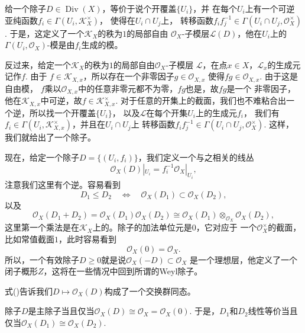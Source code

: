 \begin{para}[Cartier除子与线丛]
    给一个除子$D\in \operatorname{Div}(X)$，等价于说个开覆盖$\{U_i\}$，并
    在每个$U_i$上有一个可逆亚纯函数$f_i\in \Gamma(U_i,\mathcal K_X^\times)$，
    使得在$U_i\cap U_j$上，
    转移函数$f_if_j^{-1}\in \Gamma(U_i\cap U_j,\mathcal O_X^\times)$.
    于是，这定义了一个$\mathcal K_X$的秩为$1$的局部自由
    $\mathcal O_X$-子模层$\mathcal L(D)$，他在$U_i$上的
    $\Gamma(U_i,\mathcal O_X)$-模是由$f_i$生成的模。

    反过来，给定一个$\mathcal K_X$的秩为$1$的局部自由$\mathcal O_X$-子模层
    $\mathcal L$，在点$x\in X$，$\mathcal L_x$的生成元记作$f$. 由于
    $f\in \mathcal K_{X,x}$，所以存在一个非零因子$g\in \mathcal O_{X,x}$
    使得$fg\in \mathcal O_{X,x}$. 由于这是自由模，
    $f$乘以$\mathcal O_{X,x}$中的任意非零元都不为零，$fg$也是，故$fg$是一个
    非零因子，他在$\mathcal K_{X,x}$中可逆，故$f\in \mathcal K_{X,x}^\times$.
    对于任意的开集上的截面，我们也不难粘合出一个逆，所以找一个开覆盖$\{U_i\}$，
    以及$\mathcal L$在每个开集$U_i$上的生成元$f_i$，
    我们有$f_i\in \Gamma(U_i,\mathcal K_{X,x}^\times)$，并且在$U_i\cap U_j$上
    转移函数$f_if_j^{-1}\in \Gamma(U_i\cap U_j,\mathcal O_X^\times)$. 这样，
    我们就给出了一个除子。

    现在，给定一个除子$D=\{(U_i,f_i)\}$，我们定义一个与之相关的线丛
    \[
        \mathcal O_X(D)|_{U_i}=f_i^{-1}\mathcal O_X|_{U_i},
    \]
    注意我们这里有个逆。容易看到
    \[
        D_1\leq D_2\quad \Leftrightarrow \quad \mathcal O_X(D_1)\subset \mathcal O_X(D_2),
    \]
    以及
    \begin{equation}
        \mathcal O_X(D_1+D_2)=\mathcal O_X(D_1)\mathcal O_X(D_2)\cong 
        \mathcal O_X(D_1)\otimes_{\mathcal O_X} \mathcal O_X(D_2),
    \end{equation}
    这里第一个乘法是在$\mathcal K_X$上的。除子的加法单位元是$0$，它对应于
    一个$\mathcal O_X^\times$的截面，比如常值截面$1$，此时容易看到
    \[
        \mathcal O_X(0)=\mathcal O_X.
    \]
    所以，一个有效除子$D\geq 0$就是说$\mathcal O_X(-D)\subset \mathcal O_X$
    是一个理想层，他定义了一个闭子概形$Z$，这将在一些情况中回到所谓的Weyl除子。
\end{para}

式(\theequation)告诉我们$D\mapsto \mathcal O_X(D)$构成了一个交换群同态。

\begin{lem}
    除子$D$是主除子当且仅当$\mathcal O_X(D)\cong \mathcal O_X=\mathcal O_X(0)$.
    于是，$D_1$和$D_2$线性等价当且仅当$\mathcal O_X(D_1)\cong \mathcal O_X(D_2)$.
\end{lem}

